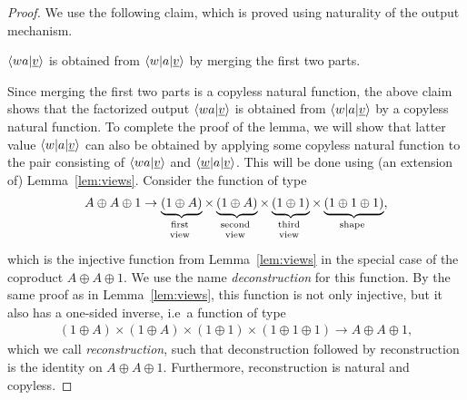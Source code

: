 \begin{proof} 
    We use the following claim, which is proved using naturality of the output mechanism. 
    \begin{claim}\label{claim:merge-factorized-output}
        $\langle wa|\underline v \rangle$ is obtained from $\langle w|a|\underline v \rangle$ by merging the first two parts.
    \end{claim}

    Since merging the first two parts is a copyless natural function,  the above claim shows that  the factorized output $\langle wa|\underline v \rangle$ is obtained from $\langle w|a|\underline v \rangle$ by a copyless natural function. To complete the proof of the lemma, we will show that latter value $\langle w|a|\underline v \rangle$  can also be obtained by applying some copyless natural function to the pair consisting of  $\langle wa|\underline v \rangle$  and $\langle \underline w|a|\underline v \rangle$. This will be done using (an extension of) Lemma~\ref{lem:views}.
    Consider the function of type 
    \begin{align*}
        A \oplus A \oplus 1 \to \myunderbrace{(1 \oplus A)}{first\\ view} \times
       \myunderbrace{(1 \oplus A)}{second\\ view} \times
       \myunderbrace{(1 \oplus 1)}{third\\ view} \times 
       \myunderbrace{(1 \oplus 1 \oplus 1)}{shape},
       \end{align*}
    which is the injective function from Lemma~\ref{lem:views} in the special case of the coproduct $A \oplus A \oplus 1$. We use the name \emph{deconstruction} for this function. By the same proof as in  Lemma~\ref{lem:views}, this function is not only injective, but it also has a one-sided inverse, i.e~a function of type
    \begin{align*}
(1 \oplus A) \times (1 \oplus A) \times (1 \oplus 1) \times (1 \oplus 1 \oplus 1) \to A \oplus A \oplus 1,
    \end{align*}
   which we call \emph{reconstruction},  such that deconstruction followed by reconstruction is the identity on $A \oplus A \oplus 1$. Furthermore,  reconstruction is natural and copyless.


\end{proof}
